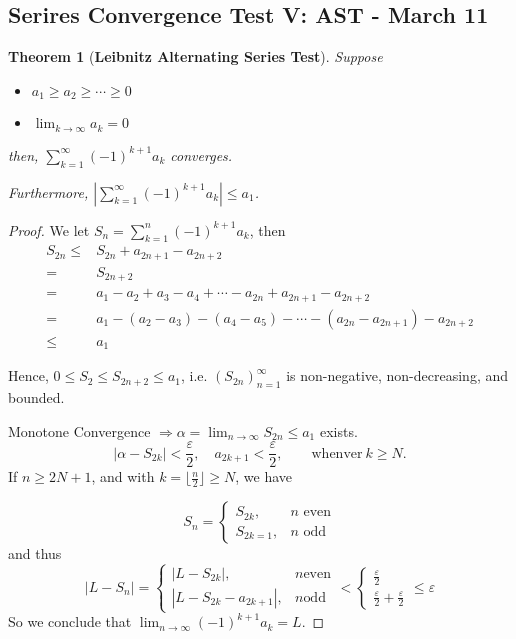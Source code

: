 \documentclass[12pt]{article}
\theoremstyle{plain}
\newtheorem{theorem}{Theorem}[subsection]
\newcommand{\abs}[1]{\left| #1 \right|}
\newcommand{\floor}[1]{\lfloor #1 \rfloor}
\newcommand{\ep}{\varepsilon}
\begin{document}
\newpage
\subsection{Serires Convergence Test V: AST - March 11}

\begin{theorem}[\textbf{Leibnitz Alternating Series Test}]
	Suppose 
	\begin{itemize}
		\item $a_1 \geq a_2 \geq \cdots \geq 0$
		\item $\lim_{k\to\infty} a_k = 0$
	\end{itemize}
	then, $\sum_{k=1}^{\infty} (-1)^{k+1} a_k$ converges.
	
	Furthermore, $\abs{\sum_{k=1}^{\infty} (-1)^{k+1} a_k}\leq a_1$. 
\end{theorem}
\begin{proof}
	We let $S_n = \sum_{k=1}^n (-1)^{k+1}a_k$, then 
	\begin{align*}
		S_{2n} \leq& S_{2n} + a_{2n+1} - a_{2n+2}	\\
		=& S_{2n+2}	\\
		=& a_1 - a_2 + a_3 - a_4 + \cdots - a_{2n} + a_{2n+1} - a_{2n+2}	\\
		=& a_1 - (a_2-a_3) - (a_4-a_5) -\cdots -(a_{2n} -a_{2n+1})-a_{2n+2}	\\
		\leq & a_1
	\end{align*}

	Hence, $0 \leq S_2 \leq S_{2n+2} \leq a_1$, i.e. $(S_{2n})_{n=1}^{\infty}$
	is non-negative, non-decreasing, and bounded. 

	Monotone Convergence $\Rightarrow \alpha = \lim_{n\to\infty} S_{2n}
	\leq a_1$ exists. 
	\[
		\abs {\alpha - S_{2k}} < \frac{\ep}2, \quad a_{2k+1}< \frac{\ep}2,
		\qquad \text{whenver} \ k \geq N. 
	\]
	If $n\geq 2N+1$, and with $k = \floor{\frac n2} \geq N$, we have

	\[
		S_n 
		= 
		\begin{cases}
			S_{2k}, &n  \text{ even}		\\
			S_{2k=1}, &n \text{ odd}
		\end{cases}
	\]
	and thus 
	\[
		\abs{L-S_n} = \begin{cases}
		\abs{L-S_{2k}}, & n \text{even}	\\
		\abs{L-S_{2k} - a_{2k+1}}, & n \text{odd}
		\end{cases}
		< 
		\begin{cases}
			\frac{\ep}2	\\
			\frac{\ep}2 + \frac{\ep}2 
		\end{cases}
		\leq \ep
	\]
	So we conclude that $\lim_{n\to\infty} (-1)^{k+1}a_{k} = L$. 
\end{proof}
\end{document}
